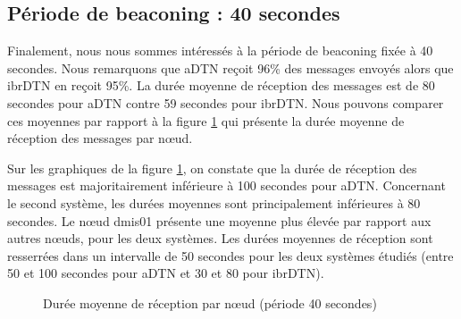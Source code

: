 \documentclass[a4paper,10pt]{article}
\begin{document}
\subsection {Période de beaconing : 40 secondes}

Finalement, nous nous sommes intéressés à la période de beaconing fixée à 40 secondes. Nous remarquons que aDTN reçoit 96\% des messages envoyés alors que ibrDTN en reçoit 95\%. La durée moyenne de réception des messages est de 80 secondes pour aDTN contre 59 secondes pour ibrDTN. Nous pouvons comparer ces moyennes par rapport à la figure \ref{fig:40_avg_rcv_duration} qui présente la durée moyenne de réception des messages par nœud.\par

Sur les graphiques de la figure \ref{fig:40_avg_rcv_duration}, on constate que la durée de réception des messages est majoritairement inférieure à 100 secondes pour aDTN. Concernant le second système, les durées moyennes sont principalement inférieures à 80 secondes. Le nœud dmis01 présente une moyenne plus élevée par rapport aux autres nœuds, pour les deux systèmes. Les durées moyennes de réception sont resserrées dans un intervalle de 50 secondes pour les deux systèmes étudiés (entre 50 et 100 secondes pour aDTN et 30 et 80 pour ibrDTN). \par

\begin{figure}[h!]
    \centering
    \caption{Durée moyenne de réception par nœud (période 40 secondes)}
    \label{fig:40_avg_rcv_duration}
\end{figure}
	
\end{document}
